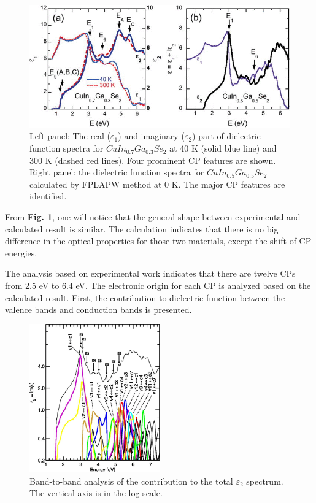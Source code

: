 \documentclass[a4paper, 12pt, titlepage,oneside,drop]{kthesis}
\begin{document}
 \begin{figure}[H]
    \begin{center}
            \includegraphics[width=1\textwidth]{111111.png}
     \end{center}
    \caption{Left panel: The real ($\varepsilon_1$) and imaginary ($\varepsilon_2$) part of dielectric function spectra for $CuIn_{0.7}Ga_{0.3}Se_2$ 
at 40 K (solid blue line) and 300 K (dashed red lines). Four prominent CP features are shown. Right panel: the dielectric function spectra for  $CuIn_{0.5}Ga_{0.5}Se_2$
calculated by FPLAPW method at 0 K. The major CP features are identified. }
   \label{df1}
\end{figure}

From \textbf{Fig. \ref{df1}}, one will notice that the general shape between experimental and calculated result is similar. The calculation indicates that there is no big 
difference in the optical properties for those two materials, except the shift of CP energies.
 
The analysis based on experimental work indicates that there are twelve CPs from 2.5 eV to 6.4 eV. The electronic origin for each CP is analyzed based on the calculated 
result. First, the contribution to dielectric function between the valence bands and conduction bands is presented.

 \begin{figure}[H]
    \begin{center}
            \includegraphics[width=0.5\textwidth]{222222}
     \end{center}
    \caption{Band-to-band analysis of the contribution to the total $\varepsilon_2$ spectrum. The vertical axis is in the log scale.}
   \label{df2}
\end{figure}
\end{document}
